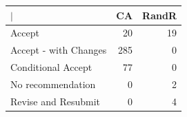 \begin{tabular}{l rr}
  \toprule
  $\vert$             & \multicolumn{1}{l}{  CA} & \multicolumn{1}{l}{ RandR} \\ 
   \midrule
Accept                &  20 &    19 \\ 
  Accept - with Changes & 285 &     0 \\ 
  Conditional Accept    &  77 &     0 \\ 
  No recommendation     &   0 &     2 \\ 
  Revise and Resubmit   &   0 &     4 \\ 
   \bottomrule
\end{tabular}
